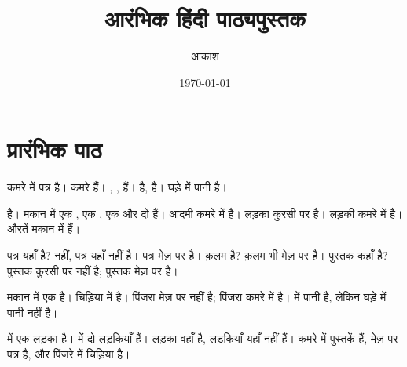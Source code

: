 \documentclass[12pt]{nextbook}
\title{आरंभिक हिंदी पाठ्यपुस्तक}
\author{आकाश}
\date{\today}
\begin{document}
\frontmatter
\maketitle
\tableofcontents
\mainmatter
\chapter{प्रारंभिक पाठ}
\begin{readersection}{कमरे में पत्र}
   है। कमरे    हैं।  , ,      हैं।    है,    है। घड़े में पानी है।

  है। मकान में एक , एक , एक  और दो  हैं। आदमी कमरे में है। लड़का कुरसी पर है। लड़की कमरे में है। औरतें मकान में हैं।

 पत्र यहाँ है? नहीं, पत्र यहाँ नहीं है। पत्र मेज़ पर है। क़लम  है? क़लम भी मेज़ पर है। पुस्तक कहाँ है? पुस्तक कुरसी पर नहीं है; पुस्तक मेज़ पर है।

मकान में एक  है। चिड़िया  में है। पिंजरा मेज़ पर नहीं है; पिंजरा कमरे में है।  में पानी है, लेकिन घड़े में पानी नहीं है।

 में एक लड़का है।  में दो लड़कियाँ हैं। लड़का वहाँ है, लड़कियाँ यहाँ नहीं हैं। कमरे में पुस्तकें हैं, मेज़ पर पत्र है, और पिंजरे में चिड़िया है।
\end{readersection}
\end{document}
